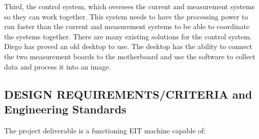 \documentclass[12pt]{article}
\begin{document}
Third, the control system, which oversees the current and measurement
systems so they can work together. This system needs to have the
processing power to run faster than the current and measurement systems
to be able to coordinate the systems together. There are many existing
solutions for the control system. Diego has proved an old desktop to
use. The desktop has the ability to connect the two measurement boards
to the motherboard and use the software to collect data and process it
into an image.

\subsection{DESIGN REQUIREMENTS/CRITERIA and Engineering Standards}
The project deliverable is a functioning EIT machine capable of:
\end{document}
